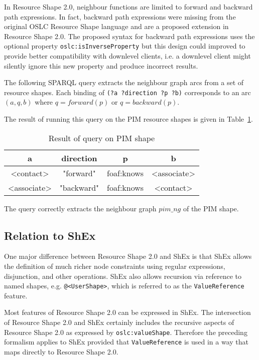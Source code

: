 \documentclass{article}
\begin{document}
In Resource Shape 2.0, neighbour functions are limited to forward and backward path expressions.
In fact, backward path expressions were missing from the original OSLC Resource Shape language and are a proposed
extension in Resource Shape 2.0. The proposed syntax for backward path expressions uses the optional property
{\tt oslc:isInverseProperty} but this design could improved to provide better compatibility with downlevel clients,
i.e. a downlevel client might silently ignore this new property and produce incorrect results.

The following SPARQL query extracts the neighbour graph arcs from a set of resource shapes.
 Each binding of {\tt (?a ?direction ?p ?b)} corresponds to an arc $(a, q, b)$ where $q=forward(p)$ or $q=backward(p)$.


The result of running this query on the PIM resource shapes is given in Table~\ref{result}.
\begin{table}[h]
\begin{center}
\begin{tt}
\begin{tabular}{|c|c|c|c|}
\hline
a			& direction	& p			& b \\
\hline
<contact>		& "forward"	& foaf:knows	& <associate> \\
<associate>	& "backward"	& foaf:knows	& <contact> \\
\hline
\end{tabular}
\end{tt}
\end{center}
\caption{Result of query on PIM shape}
\label{result}
\end{table}

The query correctly extracts the neighbour graph $pim\_ng$ of the PIM shape.

\subsection{Relation to ShEx}

One major difference between Resource Shape 2.0 and ShEx is that ShEx allows the definition of
much richer node constraints using regular expressions, disjunction, and other operations.
ShEx also allows recursion via reference to named shapes, e.g. {\tt @<UserShape>},
which is referred to as the {\tt ValueReference} feature.

Most features of Resource Shape 2.0 can be expressed in ShEx. The intersection
of Resource Shape 2.0 and ShEx certainly includes the recursive aspects of Resource Shape 2.0 as
expressed by {\tt oslc:valueShape}.
Therefore the preceding formalism applies to ShEx provided that {\tt ValueReference} is used in a way that
maps directly to Resource Shape 2.0.
\end{document}
